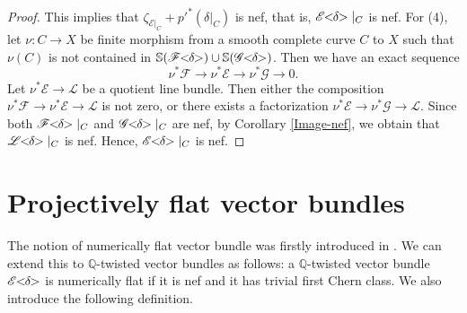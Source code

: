 \documentclass[english,reqno]{amsart}
\newcommand\bbS{{\mathbb S}}
\newcommand\sE{{\mathscr E}}
\newcommand\sF{{\mathscr F}}
\newcommand\sG{{\mathscr G}}
\newcommand\sL{{\mathscr L}}
\theoremstyle{plain}
\theoremstyle{definition}
\numberwithin{equation}{section} %
\begin{document}
\begin{proof}
    This implies that $\zeta_{\sE|_C}+p'^*(\delta\vert_C)$ is nef, that is, $\sE\hspace{-0.8ex}<\hspace{-0.8ex}\delta\hspace{-0.8ex}>\vert_C$ is nef.
    For (4), let $\nu \colon C\to X$ be finite  morphism from a smooth complete curve  $C$ to $X$ such that $\nu(C)$ is  not contained in  $ \bbS(\sF\hspace{-0.8ex}<\hspace{-0.8ex}\delta\hspace{-0.8ex}>)\cup \bbS(\sG\hspace{-0.8ex}<\hspace{-0.8ex}\delta\hspace{-0.8ex}>)$.
    Then we have an exact sequence
    \[\nu^*\sF \rightarrow \nu^*\sE\rightarrow \nu^*\sG\rightarrow 0.\]
    Let $\nu^*\sE\rightarrow \sL$ be a quotient line bundle. Then either the composition
    $\nu^*\sF\rightarrow \nu^*\sE\rightarrow \sL$
    is not zero, or there exists a factorization
    $\nu^*\sE\rightarrow \nu^*\sG\rightarrow \sL.$
    Since both $\sF\hspace{-0.8ex}<\hspace{-0.8ex}\delta\hspace{-0.8ex}>\vert_C$ and $\sG\hspace{-0.8ex}<\hspace{-0.8ex}\delta\hspace{-0.8ex}>\vert_C$ are nef, by  Corollary \ref{Image-nef},   we  obtain that $\sL\hspace{-0.8ex}<\hspace{-0.8ex}\delta\hspace{-0.8ex}>\vert_C$ is nef. Hence, $\sE\hspace{-0.8ex}<\hspace{-0.8ex}\delta\hspace{-0.8ex}>\vert_C$ is nef.
\end{proof}

\baselineskip







\section{Projectively flat vector bundles}

\label{section:proj-flat}
The notion of numerically flat vector bundle was firstly introduced in \cite[Definition 1.7]{DemaillyPeternellSchneider1994}.
We can extend this to $\mathbb{Q}$-twisted vector bundles  as follows: a $\mathbb{Q}$-twisted vector bundle $\sE\hspace{-0.8ex}<\hspace{-0.8ex}\delta\hspace{-0.8ex}>$ is numerically flat if it is nef and it has trivial first Chern class. We also introduce the following definition.
\end{document}

